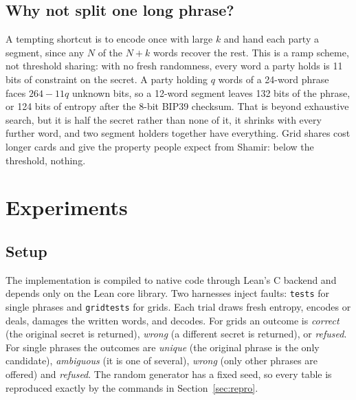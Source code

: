 \documentclass[numeric]{anvil-paper}
\newcommand{\code}[1]{\texttt{#1}}
\begin{document}
\subsection{Why not split one long phrase?}
\label{sec:ramp}

A tempting shortcut is to encode once with large $k$ and hand each party a
segment, since any $N$ of the $N+k$ words recover the rest. This is a ramp
scheme, not threshold sharing: with no fresh randomness, every word a party
holds is 11 bits of constraint on the secret. A party holding $q$ words of a
24-word phrase faces $264-11q$ unknown bits, so a 12-word segment leaves 132
bits of the phrase, or 124 bits of entropy after the 8-bit BIP39 checksum. That
is beyond exhaustive search, but it is half the secret rather than none of it,
it shrinks with every further word, and two segment holders together have
everything. Grid shares cost longer cards and give the property people expect
from Shamir: below the threshold, nothing.

\section{Experiments}
\label{sec:experiments}

\subsection{Setup}

The implementation is compiled to native code through Lean's C backend and
depends only on the Lean core library. Two harnesses inject faults:
\code{tests} for single phrases and \code{gridtests} for grids. Each trial
draws fresh entropy, encodes or deals, damages the written words, and decodes.
For grids an outcome is \emph{correct} (the original secret is returned),
\emph{wrong} (a different secret is returned), or \emph{refused}. For single
phrases the outcomes are \emph{unique} (the original phrase is the only
candidate), \emph{ambiguous} (it is one of several), \emph{wrong} (only other
phrases are offered) and \emph{refused}. The random generator has a fixed seed,
so every table is reproduced exactly by the commands in
Section~\ref{sec:repro}.
\end{document}

